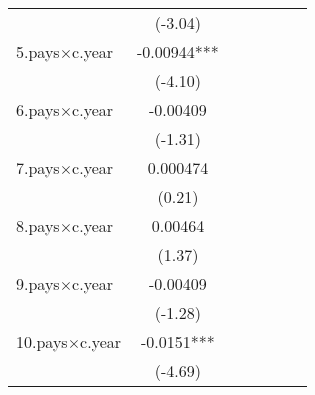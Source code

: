 {\begin{tabular}{l*{6}{c}}
                    &     (-3.04)         &                     &                     &                     &                     &                     \\
[1em]
5.pays$\times$c.year       &    -0.00944***&                     &                     &                     &                     &                     \\
                    &     (-4.10)         &                     &                     &                     &                     &                     \\
[1em]
6.pays$\times$c.year       &    -0.00409         &                     &                     &                     &                     &                     \\
                    &     (-1.31)         &                     &                     &                     &                     &                     \\
[1em]
7.pays$\times$c.year       &    0.000474         &                     &                     &                     &                     &                     \\
                    &      (0.21)         &                     &                     &                     &                     &                     \\
[1em]
8.pays$\times$c.year       &     0.00464         &                     &                     &                     &                     &                     \\
                    &      (1.37)         &                     &                     &                     &                     &                     \\
[1em]
9.pays$\times$c.year       &    -0.00409         &                     &                     &                     &                     &                     \\
                    &     (-1.28)         &                     &                     &                     &                     &                     \\
[1em]
10.pays$\times$c.year      &     -0.0151***&                     &                     &                     &                     &                     \\
                    &     (-4.69)         &                     &                     &                     &                     &                     \\

\end{tabular}}
